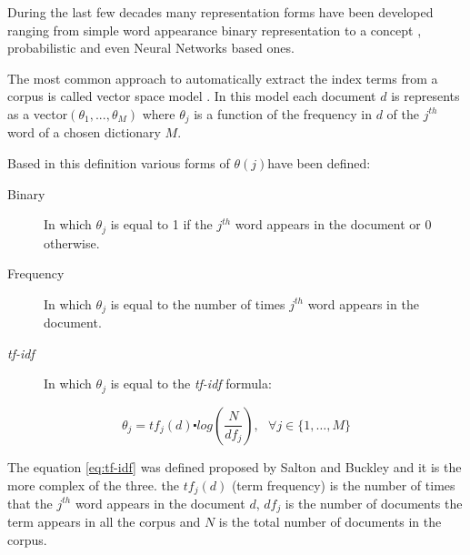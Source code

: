 
During the last few decades many representation forms have been developed
ranging from simple word appearance binary representation to a concept
\cite{deerwester90indexing}, probabilistic \cite{keller-theme} and
even Neural Networks \cite{DBLP:conf/icann/KellerB05} based ones. 

The most common approach to automatically extract the index terms
from a corpus is called vector space model \cite{361220}. In this
model each document $d$ is represents as a vector$(\theta_{1},...,\theta_{M})$
where $\theta_{j}$ is a function of the frequency in $d$ of the
$j^{th}$ word of a chosen dictionary $M$. 

Based in this definition various forms of $\theta(j)$have been defined:

\begin{description}
\item [{Binary}] In which $\theta_{j}$ is equal to 1 if the $j^{th}$
word appears in the document or 0 otherwise.
\item [{Frequency}] In which $\theta_{j}$ is equal to the number of times
$j^{th}$ word appears in the document.
\item [{\emph{tf-idf}}] In which $\theta_{j}$ is equal to the \emph{tf-idf}
formula:
\end{description}
\begin{equation}
\theta_{j}=tf_{j}(d)\centerdot log(\frac{N}{df_{j}}),\,\,\,\,\forall j\in\{1,\ldots,M\}\label{eq:tf-idf}\end{equation}


The equation \ref{eq:tf-idf} was defined proposed by Salton and Buckley
\cite{866292} and it is the more complex of the three. the $tf_{j}(d)$
(term frequency) is the number of times that the $j^{th}$ word appears
in the document $d$, $df_{j}$ is the number of documents the term
appears in all the corpus and $N$ is the total number of documents
in the corpus. 


